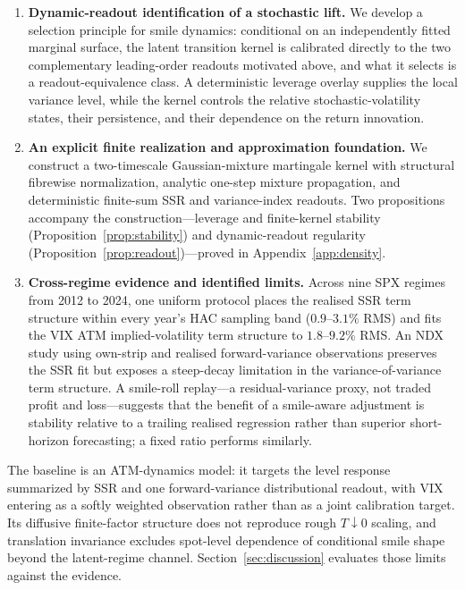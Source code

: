 \documentclass[11pt]{article}
\providecommand{\1}{\mathbf 1}
\begin{document}
\begin{enumerate}
  \item \textbf{Dynamic-readout identification of a stochastic lift.}
    We develop a selection principle for smile dynamics: conditional on an
    independently fitted marginal surface, the latent transition kernel is
    calibrated directly to the two complementary leading-order readouts
    motivated above, and what it selects is a readout-equivalence class. A
    deterministic leverage overlay supplies the local variance level, while
    the kernel controls the relative stochastic-volatility states, their
    persistence, and their dependence on the return innovation.

  \item \textbf{An explicit finite realization and approximation
    foundation.}
    We construct a two-timescale Gaussian-mixture martingale kernel with
    structural fibrewise normalization, analytic one-step mixture
    propagation, and deterministic finite-sum SSR and variance-index
    readouts. Two propositions accompany the construction---leverage and finite-kernel
    stability (Proposition~\ref{prop:stability}) and dynamic-readout regularity
    (Proposition~\ref{prop:readout})---proved in Appendix~\ref{app:density}.

  \item \textbf{Cross-regime evidence and identified limits.}
    Across nine SPX regimes from 2012 to 2024, one uniform protocol places
    the realised SSR term structure within every year's HAC sampling band
    ($0.9$--$3.1\%$ RMS) and fits the VIX ATM implied-volatility term structure to
    $1.8$--$9.2\%$ RMS. An NDX study using own-strip and realised
    forward-variance observations preserves the SSR fit but exposes a
    steep-decay limitation in the variance-of-variance term
    structure. A smile-roll replay---a residual-variance proxy, not
    traded profit and loss---suggests that the benefit of a smile-aware
    adjustment is stability relative to a trailing realised regression
    rather than superior short-horizon forecasting; a fixed ratio
    performs similarly.
\end{enumerate}

The baseline is an ATM-dynamics model: it targets the level response
summarized by SSR and one forward-variance distributional readout, with VIX
entering as a softly weighted observation rather than as a joint calibration
target. Its diffusive finite-factor structure does not reproduce rough
$T\downarrow0$ scaling, and translation invariance excludes spot-level
dependence of conditional smile shape beyond the latent-regime channel.
Section~\ref{sec:discussion} evaluates those limits against the evidence.
\end{document}
